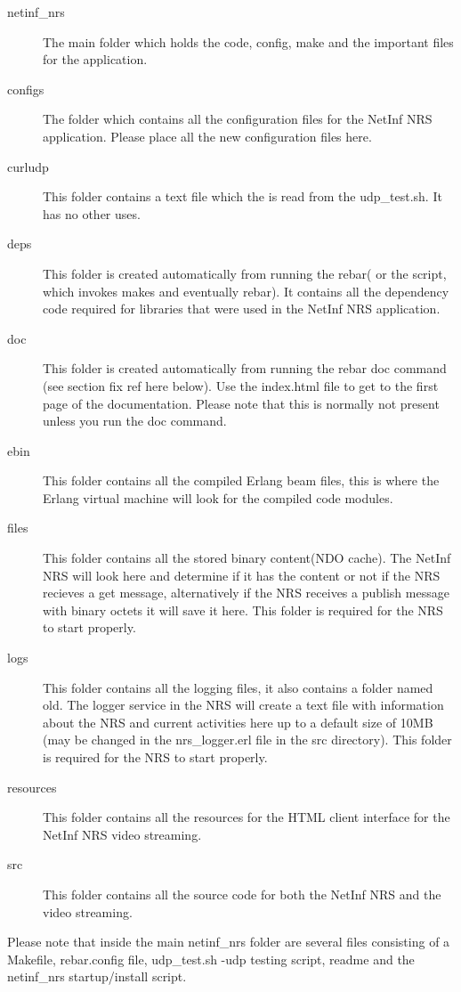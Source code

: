 \begin{description}
\item [netinf\_nrs]
The main folder which holds the code, config, make and the important files for the application.
\item [configs]
The folder which contains all the configuration files for the NetInf NRS application. Please place all the new configuration files here. 
\item [curludp]
This folder contains a text file which the is read from the udp\_test.sh. It has no other uses.
\item [deps]
This folder is created automatically from running the rebar( or the script, which invokes makes and eventually rebar). It contains all the dependency code required for libraries that were used in the NetInf NRS application. 
\item [doc]
This folder is created automatically from running the rebar doc command (see section fix ref here below). Use the index.html file to get to the first page of the documentation. Please note that this is normally not present unless you run the doc command.
\item [ebin]
This folder contains all the compiled Erlang beam files, this is where the Erlang virtual machine will look for the compiled code modules.
\item [files]
This folder contains all the stored binary content(NDO cache). The NetInf NRS will look here and determine if it has the content or not if the NRS recieves a get message, alternatively if the NRS receives a publish message with binary octets it will save it here. This folder is required for the NRS to start properly.
\item [logs]
This folder contains all the logging files, it also contains a folder named old. The logger service in the NRS will create a text file with information about the NRS and current activities here up to a default size of 10MB (may be changed in the nrs\_logger.erl file in the src directory). This folder is required for the NRS to start properly.
\item [resources]
This folder contains all the resources for the HTML client interface for the NetInf NRS video streaming.
\item [src]
This folder contains all the source code for both the NetInf NRS and the video streaming.
\end{description}

Please note that inside the main netinf\_nrs folder are several files consisting of a Makefile, rebar.config file, udp\_test.sh -udp testing script, readme and the netinf\_nrs startup/install script. 

